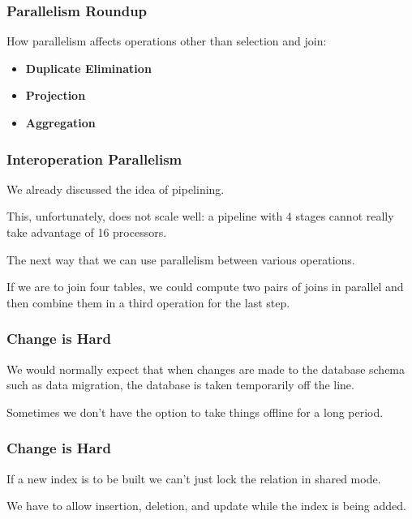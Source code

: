 \begin{frame}
\frametitle{Parallelism Roundup}

How parallelism affects operations other than selection and join:
\begin{itemize}
\item \textbf{Duplicate Elimination}
\item \textbf{Projection}
\item \textbf{Aggregation}
\end{itemize}

\end{frame}

\begin{frame}
\frametitle{Interoperation Parallelism }

We already discussed the idea of pipelining.

This, unfortunately, does not scale well: a pipeline with 4 stages cannot really take advantage of 16 processors.

The next way that we can use parallelism between various operations. 

If we are to join four tables, we could compute two pairs of joins in parallel and then combine them in a third operation for the last step. 

\end{frame}



\begin{frame}
\frametitle{Change is Hard}

We would normally expect that when changes are made to the database schema such as data migration, the database is taken temporarily off the line.

Sometimes we don't have the option to take things offline for a long period.

\end{frame}

\begin{frame}
\frametitle{Change is Hard}

If a new index is to be built we can't just lock the relation in shared mode.

We have to allow insertion, deletion, and update while the index is being added. 

\end{frame}


